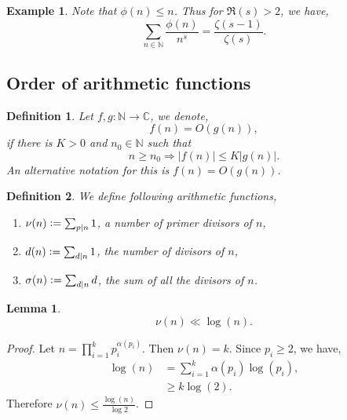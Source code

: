 \documentclass{article}
\newtheorem{definition}{Definition}[section]
\newtheorem{lemma}{Lemma}[section]
\newtheorem{example}{Example}[section]
\newcommand{\defeq}{\vcentcolon=}
\newcommand{\N}[0]{\mathbb{N}}
\newcommand{\C}[0]{\mathbb{C}}
\begin{document}
\begin{example}
  Note that $\phi(n)\leq n$. Thus for $\Re(s)>2$, we have,
  \begin{equation*}
    \sum_{n\in\N}{\frac {\phi(n)} {n^s}} = {\frac {\zeta(s-1)} {\zeta(s)}}.
  \end{equation*}
\end{example}

\subsection{Order of arithmetic functions}

\begin{definition}
  Let $f,g:\N\to\C$, we denote, 
  \begin{equation*}
    f(n) = O(g(n)),
  \end{equation*}
  if there is $K>0$ and $n_0\in\N$ such that 
  \begin{equation*}
    n\geq n_0\Rightarrow \vert f(n)\vert\leq K\vert g(n)\vert.
  \end{equation*}
  An alternative notation for this is $f(n) = O(g(n))$.
\end{definition}

\begin{definition}
  We define following arithmetic functions,
  \begin{enumerate}[1).]
    \item $\nu(n) \defeq \sum_{p|n}1$, a number of primer divisors of $n$,
    \item $d(n)\defeq \sum_{d|n}1$, the number of divisors of $n$,
    \item $\sigma(n)\defeq \sum_{d|n}d$, the sum of all the divisors of $n$.
  \end{enumerate}
\end{definition}

\begin{lemma}
  \begin{equation*}
    \nu(n)\ll \log(n).
  \end{equation*}
\end{lemma}

\begin{proof}
  Let $n = \prod_{i=1}^kp_i^{\alpha(p_i)}$. Then $\nu(n) = k$. Since $p_i\geq 2$, we have,
  \begin{align*}
    \log(n) & = \sum_{i=1}^k\alpha(p_i)\log(p_i),\\
    & \geq k\log(2).
  \end{align*}
  Therefore $\nu(n)\leq{\frac {\log(n)} {\log2}}$. 
\end{proof}
\end{document}
